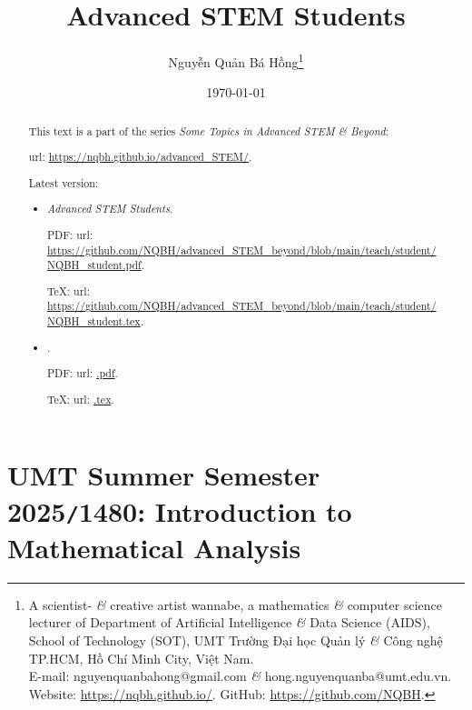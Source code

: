 \documentclass{article}
\title{Advanced STEM Students}
\author{Nguyễn Quản Bá Hồng\footnote{A scientist- {\it\&} creative artist wannabe, a mathematics {\it\&} computer science lecturer of Department of Artificial Intelligence {\it\&} Data Science (AIDS), School of Technology (SOT), UMT Trường Đại học Quản lý {\it\&} Công nghệ TP.HCM, Hồ Chí Minh City, Việt Nam.\\E-mail: {\sf nguyenquanbahong@gmail.com} {\it\&} {\sf hong.nguyenquanba@umt.edu.vn}. Website: \url{https://nqbh.github.io/}. GitHub: \url{https://github.com/NQBH}.}}
\date{\today}
\begin{document}
\maketitle
\begin{abstract}
	This text is a part of the series {\it Some Topics in Advanced STEM \& Beyond}:
	
	{\sc url}: \url{https://nqbh.github.io/advanced_STEM/}.
	
	Latest version:
	\begin{itemize}
		\item {\it Advanced STEM Students}.
		
		PDF: {\sc url}: \url{https://github.com/NQBH/advanced_STEM_beyond/blob/main/teach/student/NQBH_student.pdf}.
		
		\TeX: {\sc url}: \url{https://github.com/NQBH/advanced_STEM_beyond/blob/main/teach/student/NQBH_student.tex}.
		\item {\it }.
		
		PDF: {\sc url}: \url{.pdf}.
		
		\TeX: {\sc url}: \url{.tex}.
	\end{itemize}
\end{abstract}
\tableofcontents


\section{UMT Summer Semester 2025{\tt/}1480: Introduction to Mathematical Analysis}
\end{document}
